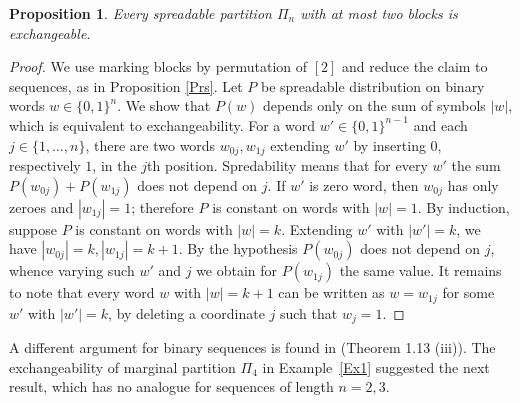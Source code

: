 \documentclass{article}
\newtheorem{proposition}{Proposition}
\begin{document}
\begin{proposition}\label{binary}
Every spreadable partition $\Pi_n$ with at most two blocks is exchangeable. 
\end{proposition}
\begin{proof}
We use  marking blocks by permutation of $[2]$
and reduce the claim to sequences, as  in Proposition \ref{Prs}.
 Let $P$ be spreadable distribution on
 binary words $w  \in \{0,1\}^n$. We  show that $P(w)$ depends only on the sum of symbols  $|w|$, which is equivalent to exchangeability.
For a word $w'  \in \{0,1\}^{n-1}$ and   each $j \in \{1, \dots, n\}$, there are  two words $w_{0j}, w_{1j}$ extending  $w'$
by inserting $0$, respectively $1$, in the $j$th position.
Spredability means that for every $w'$  the sum 
$P(w_{0j}) + P(w_{1j})$ does not depend on $j$.
If $w'$ is zero word, then $w_{0j}$ has only zeroes and $|w_{1j}|=1$; therefore $P$ is constant on words with $|w|=1$. By induction, suppose
 $P$ is constant on words with $|w|=k$. Extending $w'$ with $|w'|=k$, we have $|w_{0j}|=k, |w_{1j}|=k+1$.  By the hypothesis $P(w_{0j})$ does not depend on $j$, whence varying 
such $w'$ and $j$ we obtain for  $P(w_{1j})$  the same value. It remains to note that every word $w$ with $|w|=k+1$ can be written as $w = w_{1j}$ for some $w'$ with $|w'|=k$, by deleting a coordinate $j$ such that $w_j = 1$.
\end{proof}

A different argument  for binary sequences is  found in \cite{Kallenberg} (Theorem 1.13 (iii)).  
The exchangeability of marginal partition $\Pi_4$ in Example~\ref{Ex1} suggested the next result, which has no analogue for sequences of length $n=2,3$.
\end{document}
